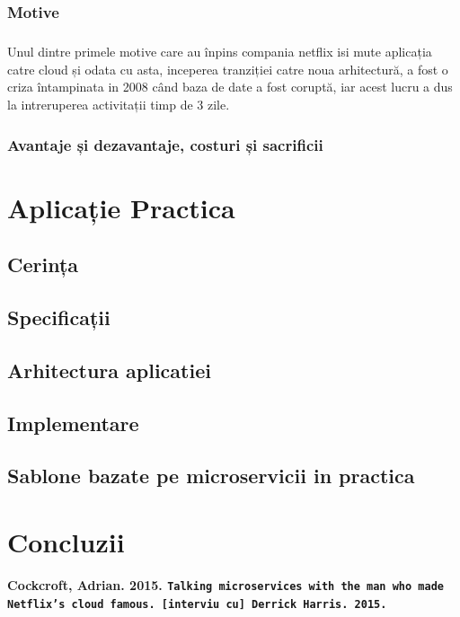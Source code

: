 \documentclass[12pt]{report}
\begin{document}
	\subsection{Motive}
	\paragraph{}Unul dintre primele motive care au înpins compania netflix isi mute aplicația catre cloud și odata cu asta, inceperea tranziției catre noua arhitectură, a fost o criza întampinata in 2008 când baza de date a fost coruptă, iar acest lucru a dus la intreruperea activitații timp de 3 zile. 
	\subsection{Avantaje și dezavantaje, costuri și sacrificii}
\chapter{Aplicație Practica}
	\section{Cerința}
	\section{Specificații}
	\section{Arhitectura aplicatiei}
	\section{Implementare}
	\section{Sablone bazate pe microservicii in practica}
\chapter{Concluzii}




\begin{flushleft}
\textbf{Cockcroft, Adrian. 2015. \texttt{Talking microservices with the man who made Netflix’s cloud famous. [interviu cu] Derrick Harris. 2015.}}
\end{flushleft}
\end{document}
